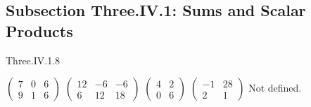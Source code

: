 \subsection{Subsection Three.IV.1: Sums and Scalar Products}
\begin{ans}{Three.IV.1.8}
      \begin{exparts*}
        \partsitem \( \begin{pmatrix}
                   7  &0  &6  \\
                   9  &1  &6
                 \end{pmatrix}  \)
        \partsitem \( \begin{pmatrix}
                  12  &-6 &-6 \\
                   6  &12 &18
                 \end{pmatrix}  \)
        \partsitem \( \begin{pmatrix}
                   4  &2  \\
                   0  &6
                 \end{pmatrix}  \)
        \partsitem \( \begin{pmatrix}
                  -1  &28 \\
                   2  &1
                 \end{pmatrix}  \)
        \partsitem Not defined.
      \end{exparts*}
   
\end{ans}
